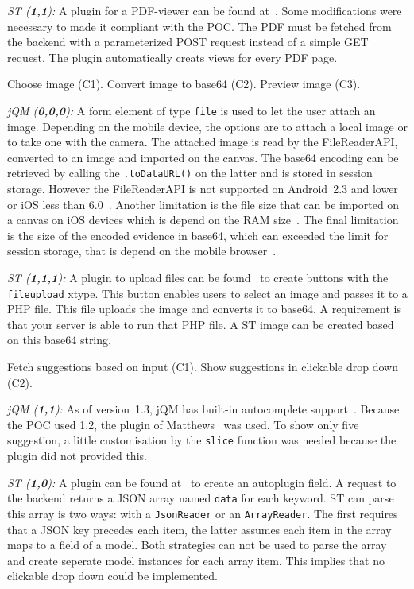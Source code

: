 \documentclass[a4paper]{artikel3}
\newcommand{\code}[1]{\texttt{#1}}
\newcommand{\setspace}[0]{\vspace{2mm}}
\renewcommand{\paragraph}[1]{\setspace \noindent {\bf #1}  }
\newcommand{\framework}[2]{ \emph{#1 (\textbf{#2}): }} %
\newcommand{\challenge}[1]{\paragraph{#1}}
\begin{document}
\framework{ST}{1,1}
A plugin for a PDF-viewer can be found at~\cite{Fiedler2012}.  
Some modifications were necessary to made it compliant with the POC.  
The PDF must be fetched from the backend with a parameterized POST request instead of a simple GET request.  
The plugin automatically creats views for every PDF page.  

\challenge{Attach image (C1,C2,C3)}
Choose image (C1).
Convert image to base64 (C2).
Preview image (C3).

\framework{jQM}{0,0,0}
A form element of type \code{file} is used to let the user attach an image.
Depending on the mobile device, the options are to attach a local image or to take one with the camera.
The attached image is read by the FileReaderAPI, converted to an image and imported on the canvas.
The base64 encoding can be retrieved by calling the \code{.toDataURL()} on the latter and is stored in session storage.
However the FileReaderAPI is not supported on Android~2.3 and lower or iOS less than 6.0~\cite{Deveria2013a}.
Another limitation is the file size that can be imported on a canvas on iOS devices which is depend on the RAM size~\cite{Apple2012}.
The final limitation is the size of the encoded evidence in base64, which can exceeded the limit for session storage, that is depend on the mobile browser~\cite{Gonzalez2012}.

\framework{ST}{1,1,1}
A plugin to upload files can be found~\cite{Smirnov2012} to create buttons with the \code{fileupload} xtype.  
This button enables users to select an image and passes it to a PHP file.  
This file uploads the image and converts it to base64.
A requirement is that your server is able to run that PHP file.    
A ST image can be created based on this base64 string.

\challenge{Autocomplete (C1,C2)}
Fetch suggestions based on input (C1).
Show suggestions in clickable drop down (C2).

\framework{jQM}{1,1}
As of version~1.3, jQM has built-in autocomplete support~\cite{JQuery2013c}.
Because the POC used 1.2, the plugin of Matthews~\cite{Matthews2013} was used.
To show only five suggestion, a little customisation by the \code{slice} function was needed because the plugin did not provided this.

\framework{ST}{1,0}
A plugin can be found at~\cite{Mysamplecode2012} to create an autoplugin field.  
A request to the backend returns a JSON array named \code{data} for each keyword.  
ST can parse this array is two ways:  with a \code{JsonReader} or an \code{ArrayReader}.  
The first requires that a JSON key precedes each item,  the latter assumes each item in the array maps to a field of a model.  
Both strategies can not be used to parse the array and create seperate model instances for each array item.  
This implies that no clickable drop down could be implemented.
\end{document}
